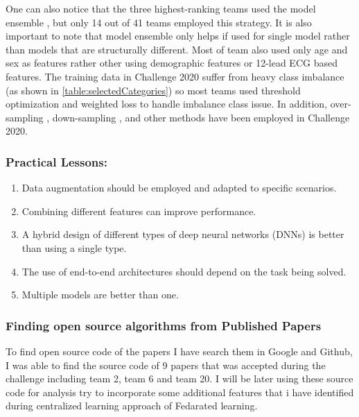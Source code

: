 \cite{main_arythmia_detection} One can also notice that the three highest-ranking teams used the model ensemble \cite{first_team, second_team, third_team}, but only 14 out of 41 teams employed this strategy. It is also important to note that model ensemble only helps if used for single model rather than models that are structurally different. Most of team also used only age and sex as features rather other using demographic features or 12-lead ECG based features. The training data in Challenge 2020 suffer from heavy class imbalance (as shown in \ref{table:selectedCategories}) so most teams used  threshold optimization \cite{eighth_team, second_team, ninth_team} and weighted loss \cite{sixth_team, seventh_team} to handle imbalance class issue. In addition, over-sampling \cite{thirteen_team}, down-sampling \cite{sixteen_team}, and other methods have been employed in Challenge 2020.

\subsubsection{Practical Lessons:}

\begin{enumerate}
  \item Data augmentation should be employed and adapted to specific scenarios.
  \item Combining different features can improve performance.
  \item A hybrid design of different types of deep neural networks (DNNs) is better than using a single type.
   \item The use of end-to-end architectures should depend on the task being solved.
   \item Multiple models are better than one.
\end{enumerate}

\subsubsection{Finding open source algorithms from Published Papers}

To find open source code of the papers I have search them in Google and Github, I was able to find the source code of 9 papers that was accepted during the challenge including team 2, team 6 and team 20. I will be later using these source code for analysis try to incorporate some additional features that i have identified during centralized learning approach of Fedarated learning. 

